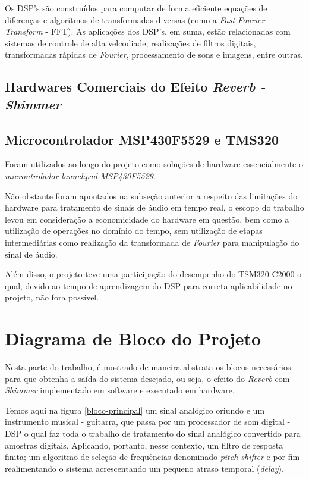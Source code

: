 		Os DSP's são construídos para computar de forma eficiente equações de diferenças e algoritmos de transformadas diversas (como a \textit{Fast Fourier Transform} - FFT). As aplicações dos DSP's, em suma, estão relacionadas com sistemas de controle de alta velcodiade, realizações de filtros digitais, transformadas rápidas de \textit{Fourier}, processamento de sons e imagens, entre outras.

	\subsection{Hardwares Comerciais do Efeito \textit{Reverb - Shimmer}}
	
	\subsection{Microcontrolador MSP430F5529 e TMS320}
	
	Foram utilizados ao longo do projeto como soluções de hardware essencialmente o \textit{microntrolador launchpad MSP430F5529}.
	
	Não obstante foram apontados na subseção anterior a respeito das limitações do hardware para tratamento de sinais de áudio em tempo real, o escopo do trabalho levou em consideração a economicidade do hardware em questão, bem como a utilização de operações no domínio do tempo, sem utilização de etapas intermediárias como realização da transformada de \textit{Fourier} para manipulação do sinal de áudio. %
	
	Além disso, o projeto teve uma participação do desempenho do TSM320 C2000 o qual, devido ao tempo de aprendizagem do DSP para correta aplicabilidade no projeto, não fora possível. %


\section{Diagrama de Bloco do Projeto}

	Nesta parte do trabalho, é mostrado de maneira abstrata os blocos necessários para que obtenha a saída do sistema desejado, ou seja, o efeito do \textit{Reverb} com \textit{Shimmer} implementado em software e executado em hardware.
	
	Temos aqui na figura \ref{bloco-principal} um sinal analógico oriundo e um instrumento musical - guitarra, que passa por um processador de som digital - DSP o qual faz toda o trabalho de tratamento do sinal analógico convertido para amostras digitais. Aplicando, portanto, nesse contexto, um filtro de resposta finita; um algoritmo de seleção de frequências denominado \textit{pitch-shifter} e por fim realimentando o sistema acrescentando um pequeno atraso temporal (\textit{delay}).
	
